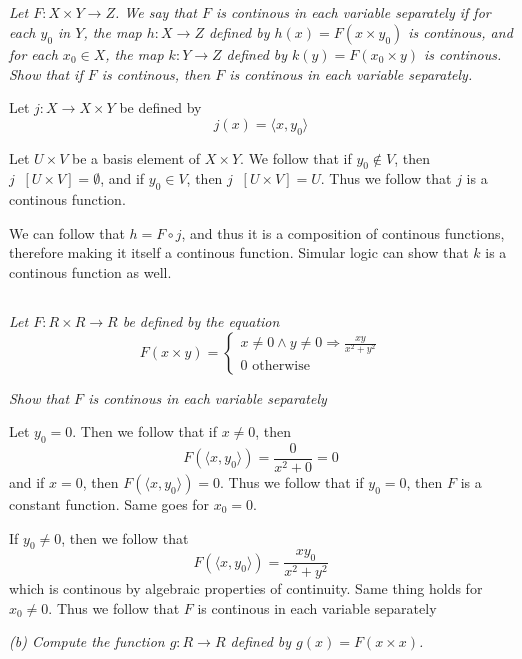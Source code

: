 \documentclass[11pt,oneside,titlepage]{book}
\DeclareMathOperator \inv {^{-1}}
\DeclareMathOperator \ra {\Rightarrow}
\newcommand{\eangle}[1]{\langle #1 \rangle}
\begin{document}
\subsection{}

\textit{Let $F: X \times Y \to Z$. We say that $F$ is continous in each variable separately if
  for each $y_0$ in $Y$, the map $h: X \to Z$ defined by $h(x) = F(x \times y_0)$ is
  continous, and for each $x_0 \in X$, the map $k: Y \to Z$ defined by $k(y) = F(x_0 \times y)$
  is continous. Show that if $F$ is continous, then $F$ is continous in each variable
  separately.}

Let $j: X \to X \times Y$ be defined by
$$j(x) = \eangle{x, y_0}$$

Let $U \times V$ be a basis element of $X \times Y$. We follow that if $y_0 \notin V$, then
$j\inv[U \times V] = \emptyset$, and if $y_0 \in V$, then $j\inv[U \times V] = U$.
Thus we follow that $j$ is a continous function. 

We can follow that $h = F \circ j$, and thus it is a composition of continous functions,
therefore making it itself a continous function. Simular logic can show that $k$ is
a continous function  as well.

\subsection{}

\textit{Let $F: R \times R \to R$ be defined by the equation
  $$F(x \times y) =
  \begin{cases}
    x\neq 0 \land y \neq 0 \ra \frac{xy}{x^2 + y^2} \\
    0 \text{ otherwise}
  \end{cases}
  $$
}

\textit{Show that $F$ is continous in each variable separately}

Let $y_0 = 0$. Then we follow that if $x \neq 0$, then
$$F(\eangle{x, y_0}) = \frac{0}{x^2 + 0} = 0$$
and if $x = 0$, then $F(\eangle{x, y_0}) = 0$. Thus we follow that if $y_0 = 0$, then $F$ is
a constant function. Same goes for $x_0 = 0$.

If $y_0 \neq 0$, then we follow that 
$$F(\eangle{x, y_0}) = \frac{xy_0}{x^2 + y^2}$$
which is continous by algebraic properties of continuity. Same thing holds for $x_0 \neq 0$.
Thus we follow that $F$ is continous in each variable separately

\textit{(b) Compute the function $g: R \to R$ defined by $g(x) = F(x \times x)$.}
\end{document}
